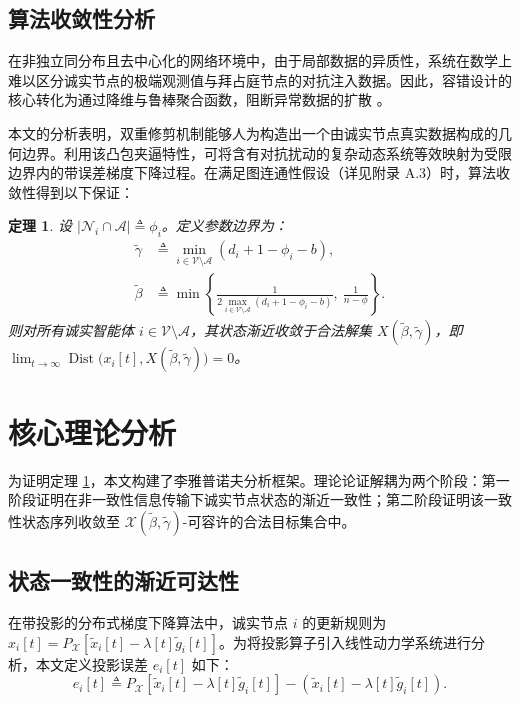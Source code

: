 \documentclass[12pt,hyperref,a4paper,UTF8]{ctexart}
\newtheorem{theorem}{定理}[section]
\numberwithin{equation}{section}
\numberwithin{figure}{section}
\numberwithin{table}{section}
\begin{document}
\subsection{算法收敛性分析}
\quad \quad 在非独立同分布且去中心化的网络环境中，由于局部数据的异质性，系统在数学上难以区分诚实节点的极端观测值与拜占庭节点的对抗注入数据。因此，容错设计的核心转化为通过降维与鲁棒聚合函数，阻断异常数据的扩散 \cite{sundaram2019distributed}。

本文的分析表明，双重修剪机制能够人为构造出一个由诚实节点真实数据构成的几何边界。利用该凸包夹逼特性，可将含有对抗扰动的复杂动态系统等效映射为受限边界内的带误差梯度下降过程。在满足图连通性假设（详见附录 A.3）时，算法收敛性得到以下保证：

\begin{theorem}
    设 $|\mathcal{N}_i\cap\mathcal{A}| \triangleq \phi_i$。定义参数边界为：
    \begin{align}
        \tilde{\gamma} &\triangleq \min_{i \in \mathcal{V} \setminus \mathcal{A}} (d_i + 1 - \phi_i - b), \\
        \tilde{\beta}  &\triangleq \min\left\{\frac{1}{2\max_{i \in \mathcal{V} \setminus \mathcal{A}}(d_i + 1 - \phi_i - b)},\ \frac{1}{n - \phi}\right\}.
    \end{align}
    则对所有诚实智能体 $i\in\mathcal{V}\setminus\mathcal{A}$，其状态渐近收敛于合法解集 $X(\widetilde{\beta}, \widetilde{\gamma})$，即 \\ 
    $\lim_{t\to\infty} \operatorname{Dist}\bigl(x_i[t], X(\widetilde{\beta}, \widetilde{\gamma})\bigr) = 0$。
    \label{thm:main}
\end{theorem}

\section{核心理论分析}

\quad \quad  为证明定理 \ref{thm:main}，本文构建了李雅普诺夫分析框架。理论论证解耦为两个阶段：第一阶段证明在非一致性信息传输下诚实节点状态的渐近一致性；第二阶段证明该一致性状态序列收敛至 $\mathcal{X}(\tilde{\beta}, \tilde{\gamma})$-可容许的合法目标集合中。

\subsection{状态一致性的渐近可达性}
\quad \quad  在带投影的分布式梯度下降算法中，诚实节点 $i$ 的更新规则为 $x_i[t] = P_{\mathcal{X}} [\tilde{x}_i[t] - \lambda[t]\tilde{g}_i[t]]$。为将投影算子引入线性动力学系统进行分析，本文定义投影误差 $e_i[t]$ 如下：
\begin{equation} \label{eq:proj_err}
    e_i[t] \triangleq P_{\mathcal{X}} [\tilde{x}_i[t] - \lambda[t]\tilde{g}_i[t]] - (\tilde{x}_i[t] - \lambda[t]\tilde{g}_i[t]).
\end{equation}
\end{document}
